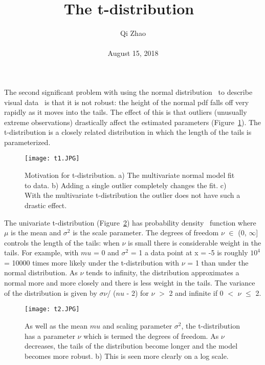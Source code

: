 \documentclass[10pt,twocolumn,letterpaper]{article}
\begin{document}
\title{The t-distribution~\cite{Geweke1991Efficient}}
\author{Qi Zhao\\\\August 15, 2018}

\maketitle
The second significant problem with using the normal distribution~\cite{Stein1981Estimation} to describe visual data~\cite{Andrienko1999Interactive} is that it is not robust: the height of the normal pdf falls off very rapidly as it moves into the tails. The effect of this is that outliers (unusually extreme observations) drastically affect the estimated parameters (Figure~\ref{fig:one}). The t-distribution is a closely related distribution in which the length of the tails is parameterized.
\begin{figure}[H]
\centering
\texttt{[image: t1.JPG]}
 \caption{ Motivation for t-distribution. a) The multivariate normal model fit to data. b) Adding a single outlier completely changes the fit. c) With the multivariate t-distribution the outlier does not have such a drastic effect.}
\label{fig:one}
\end{figure}
The univariate t-distribution (Figure~\ref{fig:two}) has probability density~\cite{Parzen1962On} function where $\mu$ is the mean and $\sigma^2$ is the scale parameter. The degrees of freedom $\nu$ $\in$ (0, $\infty$] controls the length of the tails: when $\nu$ is small there is considerable weight in the tails. For example, with $mu$ = 0 and $\sigma^2$ = 1 a data point at x = -5 is roughly $10^4$ = 10000 times more likely under the t-distribution with $\nu$ = 1 than under the normal distribution. As $\nu$ tends to infinity, the distribution approximates a normal more and more closely and there is less weight in the tails. The variance of the distribution is given by $\sigma$$\nu$/ ($nu$ - 2) for $\nu$ $>$ 2 and infinite if 0 $<$ $\nu$ $\leq$ 2.


\begin{figure}[H]
\centering
\texttt{[image: t2.JPG]}
 \caption{  As well as the mean $mu$ and scaling parameter $\sigma^2$, the t-distribution has a parameter $\nu$ which is termed the degrees of freedom. As $\nu$ decreases, the tails of the distribution become longer and the model becomes more robust. b) This is seen more clearly on a log scale.}
\label{fig:two}
\end{figure}
\end{document}
